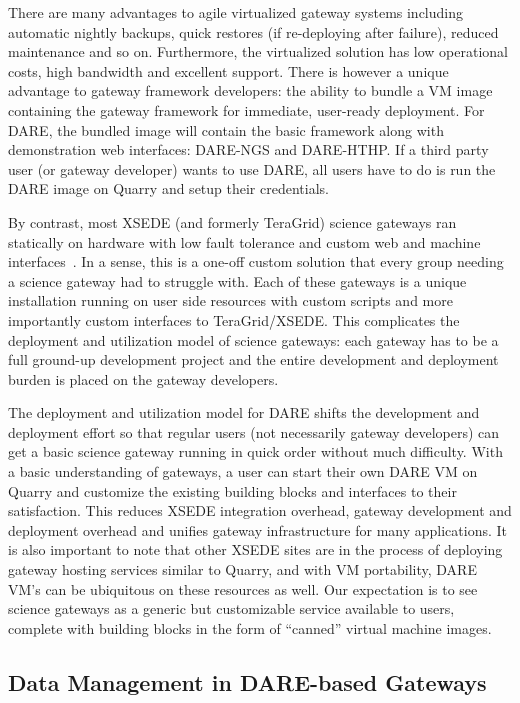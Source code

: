 \documentclass[]{svjour3}
\begin{document}
There are many advantages to agile virtualized gateway systems
including automatic nightly backups, quick restores (if re-deploying
after failure), reduced maintenance and so on. Furthermore, the
virtualized solution has low operational costs, high bandwidth and
excellent support. There is however a unique advantage to gateway
framework developers: the ability to bundle a VM image containing the
gateway framework for immediate, user-ready deployment.  For DARE, the
bundled image will contain the basic framework along with
demonstration web interfaces: DARE-NGS and DARE-HTHP. If a third party
user (or gateway developer) wants to use DARE, all users have to do is
run the DARE image on Quarry and setup their credentials.

By contrast, most XSEDE (and formerly TeraGrid) science gateways ran
statically on hardware with low fault tolerance and custom web and
machine interfaces~\cite{xsedegateways}. In a
sense, this is a one-off custom solution that every group needing a
science gateway had to struggle with. Each of these gateways is a
unique installation running on user side resources with custom scripts
and more importantly custom interfaces to TeraGrid/XSEDE.  This
complicates the deployment and utilization model of science gateways:
each gateway has to be a full ground-up development project and the
entire development and deployment burden is placed on the gateway
developers.

The deployment and utilization model for DARE shifts the development
and deployment effort so that regular users (not necessarily gateway
developers) can get a basic science gateway running in quick order
without much difficulty.  With a basic understanding of gateways, a
user can start their own DARE VM on Quarry and customize the existing
building blocks and interfaces to their satisfaction. This reduces
XSEDE integration overhead, gateway development and deployment
overhead and unifies gateway infrastructure for many applications. It
is also important to note that other XSEDE sites are in the process of
deploying gateway hosting services similar to Quarry, and with VM
portability, DARE VM's can be ubiquitous on these resources as
well. Our expectation is to see science gateways as a generic but
customizable service available to users, complete with building blocks
in the form of ``canned'' virtual machine images.


\subsection{Data Management in DARE-based Gateways}
\end{document}

